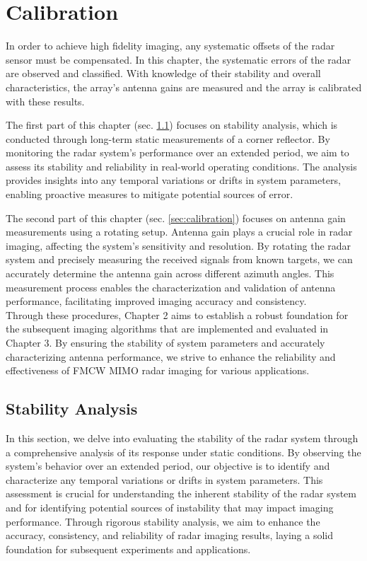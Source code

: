 \chapter{Calibration}

In order to achieve high fidelity imaging, any systematic offsets of the radar sensor must be compensated.
In this chapter, the systematic errors of the radar are observed and classified.
With knowledge of their stability and overall characteristics,
the array's antenna gains are measured and the array is calibrated with these results.

The first part of this chapter (sec. \ref{sec:stability_analysis}) focuses on stability analysis,
which is conducted through long-term static measurements of a corner reflector.
By monitoring the radar system's performance over an extended period,
we aim to assess its stability and reliability in real-world operating conditions.
The analysis provides insights into any temporal variations or drifts in system parameters,
enabling proactive measures to mitigate potential sources of error.

The second part of this chapter (sec. \ref{sec:calibration}) focuses on antenna gain measurements using a rotating setup.
Antenna gain plays a crucial role in radar imaging, affecting the system's sensitivity and resolution.
By rotating the radar system and precisely measuring the received signals from known targets,
we can accurately determine the antenna gain across different azimuth angles.
This measurement process enables the characterization and validation of antenna performance,
facilitating improved imaging accuracy and consistency. \\

Through these procedures, Chapter 2 aims to establish a robust foundation
for the subsequent imaging algorithms that are implemented and evaluated in Chapter 3.
By ensuring the stability of system parameters and accurately characterizing antenna performance,
we strive to enhance the reliability and effectiveness of FMCW MIMO radar imaging for various applications.


\section{Stability Analysis}
\label{sec:stability_analysis}

In this section, we delve into evaluating the stability of the radar system through a comprehensive analysis of its response under static conditions.
By observing the system's behavior over an extended period,
our objective is to identify and characterize any temporal variations or drifts in system parameters.
This assessment is crucial for understanding the inherent stability of the radar system and
for identifying potential sources of instability that may impact imaging performance.
Through rigorous stability analysis, we aim to enhance the accuracy, consistency, and reliability of radar imaging results,
laying a solid foundation for subsequent experiments and applications.

